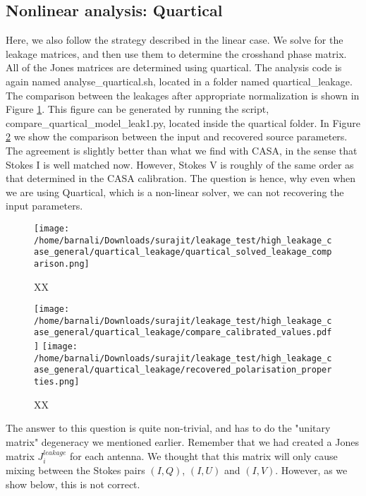 \documentclass{article}
\begin{document}
\subsection{Nonlinear analysis: Quartical}

Here, we also follow the strategy described in the linear case. We solve for the leakage matrices, and then use them to determine the crosshand phase matrix. All of the Jones matrices are determined using quartical. The analysis code is again named  analyse\_quartical.sh, located in a folder named quartical\_leakage. The comparison between the leakages after appropriate normalization is shown in Figure \ref{fig:nonlinear_quartical_leak_comparison_high_leak_general}. This figure can be generated by running the script, compare\_quartical\_model\_leak1.py, located inside the quartical folder. In Figure \ref{fig:compare_input_output_source_params_quartical_high_leak_general} we show the comparison between the input and recovered source parameters. The agreement is slightly better than what we find with CASA, in the sense that Stokes I is well matched now. However, Stokes V is roughly of the same order as that determined in the CASA calibration. The question is hence, why even when we are using Quartical, which is a non-linear solver, we can not recovering the input parameters. 

\begin{figure}
\centering
\texttt{[image: /home/barnali/Downloads/surajit/leakage\_test/high\_leakage\_case\_general/quartical\_leakage/quartical\_solved\_leakage\_comparison.png]}
\caption{XX}
\label{fig:nonlinear_quartical_leak_comparison_high_leak_general}
\end{figure} 

\begin{figure}
\centering
\texttt{[image: /home/barnali/Downloads/surajit/leakage\_test/high\_leakage\_case\_general/quartical\_leakage/compare\_calibrated\_values.pdf]}
\texttt{[image: /home/barnali/Downloads/surajit/leakage\_test/high\_leakage\_case\_general/quartical\_leakage/recovered\_polarisation\_properties.png]}
\caption{XX}
\label{fig:compare_input_output_source_params_quartical_high_leak_general}
\end{figure}

The answer to this question is quite non-trivial, and has to do the "unitary matrix" degeneracy we mentioned earlier. Remember that we had created a Jones matrix $J^{leakage}_i$ for each antenna. We thought that this matrix will only cause mixing between the Stokes pairs $(I,Q)$, $(I,U)$ and $(I,V)$. However, as we show below, this is not correct.
\end{document}

